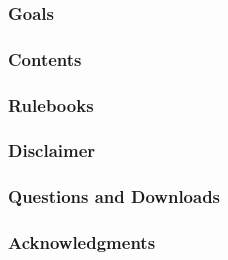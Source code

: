 

\subsubsection*{Goals}



\subsubsection*{Contents}



\subsubsection*{Rulebooks}



\subsubsection*{Disclaimer}



\subsubsection*{Questions and Downloads}



\subsubsection*{Acknowledgments}

